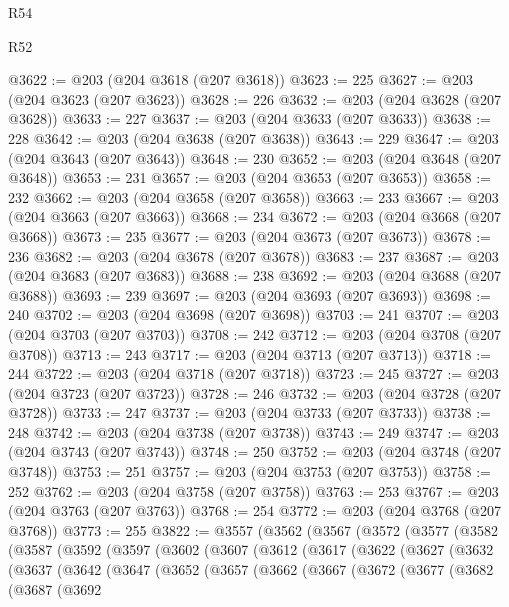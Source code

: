 \begin{lexlean}{R54}
\begin{lexlean}{R52}
\begin{coremodule}
{{{{{{{{{{{{{{{{{{{{{{{{{{{{{{{{{{{{{{{{{{{{{{{{{{{{{{{{{{{{{{{{{{{{{{{{{{{{{{{{{{{{{{{{{{{{{{{{{{{{{{{{{{{{{{{{{{{{{{{{{{{{{{{{{{{{{{{{{{{{{{{{{{{{{{{{{{{{{{{{{{{{{{{{{{{{{{{{{{{{{{{{{{{{{{{{{{{{{{@3622 := @203 (@204 @3618 (@207 @3618))
@3623 := 225
@3627 := @203 (@204 @3623 (@207 @3623))
@3628 := 226
@3632 := @203 (@204 @3628 (@207 @3628))
@3633 := 227
@3637 := @203 (@204 @3633 (@207 @3633))
@3638 := 228
@3642 := @203 (@204 @3638 (@207 @3638))
@3643 := 229
@3647 := @203 (@204 @3643 (@207 @3643))
@3648 := 230
@3652 := @203 (@204 @3648 (@207 @3648))
@3653 := 231
@3657 := @203 (@204 @3653 (@207 @3653))
@3658 := 232
@3662 := @203 (@204 @3658 (@207 @3658))
@3663 := 233
@3667 := @203 (@204 @3663 (@207 @3663))
@3668 := 234
@3672 := @203 (@204 @3668 (@207 @3668))
@3673 := 235
@3677 := @203 (@204 @3673 (@207 @3673))
@3678 := 236
@3682 := @203 (@204 @3678 (@207 @3678))
@3683 := 237
@3687 := @203 (@204 @3683 (@207 @3683))
@3688 := 238
@3692 := @203 (@204 @3688 (@207 @3688))
@3693 := 239
@3697 := @203 (@204 @3693 (@207 @3693))
@3698 := 240
@3702 := @203 (@204 @3698 (@207 @3698))
@3703 := 241
@3707 := @203 (@204 @3703 (@207 @3703))
@3708 := 242
@3712 := @203 (@204 @3708 (@207 @3708))
@3713 := 243
@3717 := @203 (@204 @3713 (@207 @3713))
@3718 := 244
@3722 := @203 (@204 @3718 (@207 @3718))
@3723 := 245
@3727 := @203 (@204 @3723 (@207 @3723))
@3728 := 246
@3732 := @203 (@204 @3728 (@207 @3728))
@3733 := 247
@3737 := @203 (@204 @3733 (@207 @3733))
@3738 := 248
@3742 := @203 (@204 @3738 (@207 @3738))
@3743 := 249
@3747 := @203 (@204 @3743 (@207 @3743))
@3748 := 250
@3752 := @203 (@204 @3748 (@207 @3748))
@3753 := 251
@3757 := @203 (@204 @3753 (@207 @3753))
@3758 := 252
@3762 := @203 (@204 @3758 (@207 @3758))
@3763 := 253
@3767 := @203 (@204 @3763 (@207 @3763))
@3768 := 254
@3772 := @203 (@204 @3768 (@207 @3768))
@3773 := 255
@3822 := @3557
    (@3562
      (@3567
        (@3572
          (@3577
            (@3582
              (@3587
                (@3592
                  (@3597
                    (@3602
                      (@3607
                        (@3612
                          (@3617
                            (@3622
                              (@3627
                                (@3632
                                  (@3637
                                    (@3642
                                      (@3647
                                        (@3652
                                          (@3657
                                            (@3662
                                              (@3667
                                                (@3672
                                                  (@3677
                                                    (@3682
                                                      (@3687
                                                        (@3692
}}}}}}}}}}}}}}}}}}}}}}}}}}}}}}}}}}}}}}}}}}}}}}}}}}}}}}}}}}}}}}}}}}}}}}}}}}}}}}}}}}}}}}}}}}}}}}}}}}}}}}}}}}}}}}}}}}}}}}}}}}}}}}}}}}}}}}}}}}}}}}}}}}}}}}}}}}}}}}}}}}}}}}}}}}}}}}}}}}}}}}}}}}}}}}}}}}}}}}
\end{coremodule}
\end{lexlean}
\end{lexlean}
